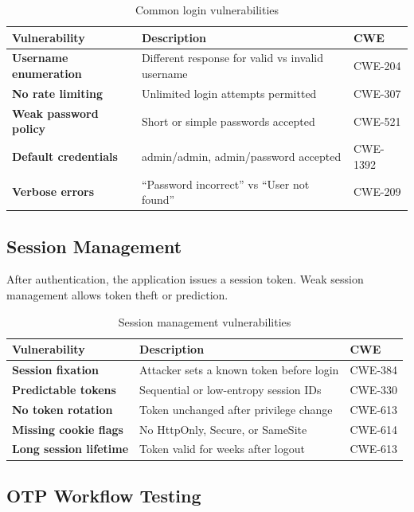 \begin{table}[H]
\centering
\caption{Common login vulnerabilities}
\begin{tabularx}{\textwidth}{>{\bfseries}lXl}
\toprule
Vulnerability & Description & CWE \\
\midrule
Username enumeration & Different response for valid vs invalid username & CWE-204 \\
No rate limiting & Unlimited login attempts permitted & CWE-307 \\
Weak password policy & Short or simple passwords accepted & CWE-521 \\
Default credentials & admin/admin, admin/password accepted & CWE-1392 \\
Verbose errors & ``Password incorrect'' vs ``User not found'' & CWE-209 \\
\bottomrule
\end{tabularx}
\end{table}

\subsection{Session Management}

After authentication, the application issues a session token. Weak session management allows token theft or prediction.

\begin{table}[H]
\centering
\caption{Session management vulnerabilities}
\begin{tabularx}{\textwidth}{>{\bfseries}lXl}
\toprule
Vulnerability & Description & CWE \\
\midrule
Session fixation & Attacker sets a known token before login & CWE-384 \\
Predictable tokens & Sequential or low-entropy session IDs & CWE-330 \\
No token rotation & Token unchanged after privilege change & CWE-613 \\
Missing cookie flags & No HttpOnly, Secure, or SameSite & CWE-614 \\
Long session lifetime & Token valid for weeks after logout & CWE-613 \\
\bottomrule
\end{tabularx}
\end{table}

\subsection{OTP Workflow Testing}

